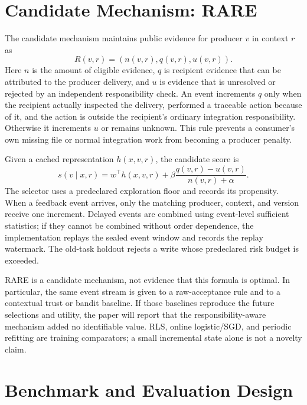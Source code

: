 \documentclass[sigconf,anonymous]{aamas}
\begin{document}
\section{Candidate Mechanism: RARE}

The candidate mechanism maintains public evidence for producer $v$ in context $r$ as
\begin{equation}
 R(v,r)=(n(v,r),q(v,r),u(v,r)).
 \label{eq:state}
\end{equation}
Here $n$ is the amount of eligible evidence, $q$ is recipient evidence that can be
attributed to the producer delivery, and $u$ is evidence that is unresolved or rejected
by an independent responsibility check. An event increments $q$ only when the recipient
actually inspected the delivery, performed a traceable action because of it, and the
action is outside the recipient's ordinary integration responsibility. Otherwise it
increments $u$ or remains unknown. This rule prevents a consumer's own missing file or
normal integration work from becoming a producer penalty.

Given a cached representation $h(x,v,r)$, the candidate score is
\begin{equation}
 s(v\mid x,r)=w^\top h(x,v,r)+\beta
 \frac{q(v,r)-u(v,r)}{n(v,r)+\alpha}.
 \label{eq:score}
\end{equation}
The selector uses a predeclared exploration floor and records its propensity. When a
feedback event arrives, only the matching producer, context, and version receive one
increment. Delayed events are combined using event-level sufficient statistics; if they
cannot be combined without order dependence, the implementation replays the sealed event
window and records the replay watermark. The old-task holdout rejects a write whose
predeclared risk budget is exceeded.

RARE is a candidate mechanism, not evidence that this formula is optimal. In particular,
the same event stream is given to a raw-acceptance rule and to a contextual trust or
bandit baseline. If those baselines reproduce the future selections and utility, the
paper will report that the responsibility-aware mechanism added no identifiable value.
RLS, online logistic/SGD, and periodic refitting are training comparators; a small
incremental state alone is not a novelty claim.

\section{Benchmark and Evaluation Design}
\end{document}
